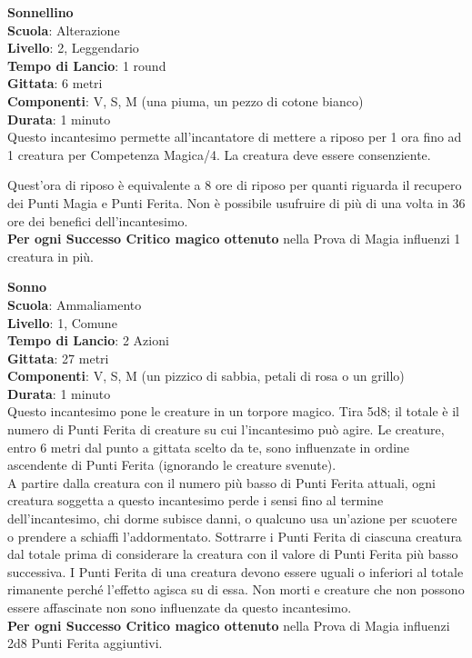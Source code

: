 \begin{multicols}{2}
\medskip\textbf{Sonnellino}\\
\textbf{Scuola}: Alterazione\\
\textbf{Livello}: 2, Leggendario\\
\textbf{Tempo di Lancio}: 1 round\\
\textbf{Gittata}: 6 metri\\
\textbf{Componenti}: V, S, M (una piuma, un pezzo di cotone bianco)\\
\textbf{Durata}: 1 minuto\\
Questo incantesimo permette all'incantatore di mettere a riposo per 1 ora fino ad 1 creatura per Competenza Magica/4. La creatura deve essere consenziente.

Quest'ora di riposo è equivalente a 8 ore di riposo per quanti riguarda il recupero dei Punti Magia e Punti Ferita. Non è possibile usufruire di più di una volta in 36 ore dei benefici dell'incantesimo.\\
\textbf{Per ogni Successo Critico magico ottenuto} nella Prova di Magia influenzi 1 creatura in più.

\medskip\textbf{Sonno}\\
\textbf{Scuola}: Ammaliamento\\
\textbf{Livello}: 1, Comune\\
\textbf{Tempo di Lancio}: 2 Azioni\\
\textbf{Gittata}: 27 metri\\
\textbf{Componenti}: V, S, M (un pizzico di sabbia, petali di rosa o un grillo)\\
\textbf{Durata}: 1 minuto\\
Questo incantesimo pone le creature in un torpore magico. Tira 5d8; il totale è il numero di Punti Ferita di creature su cui l'incantesimo può agire. Le creature, entro 6 metri dal punto a gittata scelto da te, sono influenzate in ordine ascendente di Punti Ferita (ignorando le creature svenute).\\
A partire dalla creatura con il numero più basso di Punti Ferita attuali, ogni creatura soggetta a questo incantesimo perde i sensi fino al termine dell'incantesimo, chi dorme subisce danni, o qualcuno usa un'azione per scuotere o prendere a schiaffi l'addormentato. Sottrarre i Punti Ferita di ciascuna creatura dal totale prima di considerare la creatura con il valore di Punti Ferita più basso successiva. I Punti Ferita di una creatura devono essere uguali o inferiori al totale rimanente perché l'effetto agisca su di essa. Non morti e creature che non possono essere affascinate non sono influenzate da questo incantesimo.\\
\textbf{Per ogni Successo Critico magico ottenuto} nella Prova di Magia influenzi 2d8 Punti Ferita aggiuntivi.


\end{multicols}
